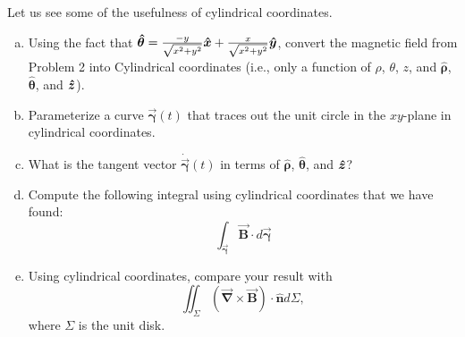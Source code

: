 \documentclass[12pt]{article} %
\newcommand{\grad}{\boldsymbol{\vec{\nabla}}}
\newcommand{\curvegamma}{\boldsymbol{\vec{\gamma}}}
\newcommand{\tangentgamma}{\boldsymbol{\dot{\vec{\gamma}}}}
\newcommand{\thetahat}{\boldsymbol{\hat{\theta}}}
\newcommand{\rhohat}{\boldsymbol{\hat{\rho}}}
\newcommand{\unitvec}{\boldsymbol{\hat{n}}}
\newcommand{\vecfieldB}{\boldsymbol{\vec{B}}}
\begin{document}
\newpage
\begin{problem}
Let us see some of the usefulness of cylindrical coordinates.
\begin{enumerate}[(a)]
    \item Using the fact that $\thetahat = \frac{-y}{\sqrt{x^2+y^2}}\xhat + \frac{x}{\sqrt{x^2+y^2}}\yhat$, convert the magnetic field from Problem 2 into Cylindrical coordinates (i.e., only a function of $\rho$, $\theta$, $z$, and $\rhohat$, $\thetahat$, and $\boldsymbol{\hat{z}}$).  
        \item Parameterize a curve $\curvegamma(t)$ that traces out the unit circle in the $xy$-plane in cylindrical coordinates.
        \item What is the tangent vector $\tangentgamma(t)$ in terms of $\rhohat$, $\thetahat$, and $\boldsymbol{\hat{z}}$?
        \item Compute the following integral using cylindrical coordinates that we have found:
        \[
        \int_{\curvegamma} \vecfieldB \cdot d\curvegamma
        \]
        \item Using cylindrical coordinates, compare your result with
        \[
        \iint_\Sigma \left(\grad \times \vecfieldB\right) \cdot \unitvec d\Sigma,
        \]
        where $\Sigma$ is the unit disk.
\end{enumerate}
\end{problem}
\end{document}
